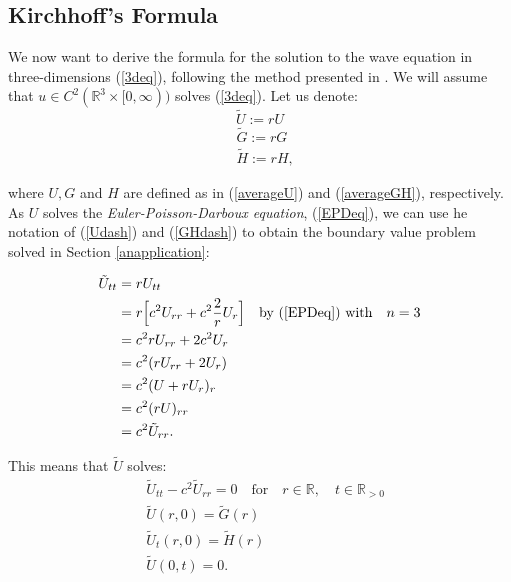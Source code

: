 \documentclass[a4paper, 12pt]{article}
\numberwithin{equation}{section}
\begin{document}
\subsection{Kirchhoff's Formula}
We now want to derive the formula for the solution to the wave equation in
three-dimensions (\ref{3deq}), following the method presented in \cite[Ch. 2.4.1.c]{Ev}. We will assume that $u \in C^2(\mathbb{R}^3
\times [0, \infty))$ solves (\ref{3deq}). Let us denote:
\begin{equation} \label{Udash}
    \tilde{U}:=rU
\end{equation}
\begin{equation} \label{GHdash}
    \begin{aligned}
        &\tilde{G}:=rG\\
        &\tilde{H}:=rH,    
    \end{aligned}
\end{equation}

where $U,G$ and $H$ are defined as in (\ref{averageU}) and (\ref{averageGH}),
respectively. \\

As $U$ solves the \emph{Euler-Poisson-Darboux equation}, (\ref{EPDeq}), we can
use he notation of (\ref{Udash}) and (\ref{GHdash}) to obtain the boundary value
problem solved in Section \ref{anapplication}:

\begin{equation*}
    \begin{aligned}
        \tilde{U}_{tt}&=rU_{tt}\\
        &=r\Big[c^2U_{rr}+c^2\frac{2}{r}U_r\Big] \quad \textrm{by (\ref{EPDeq}) with} \quad n=3\\
        &=c^2rU_{rr}+2c^2U_r\\
        &=c^2(rU_{rr}+2U_r)\\
        &=c^2(U+rU_r)_r\\
        &=c^2(rU)_{rr}\\
        &=c^2\tilde{U}_{rr}.        
    \end{aligned}
\end{equation*}

This means that $\tilde{U}$ solves:
\begin{equation} \label{tilUwave}
    \begin{aligned}
        &\tilde{U}_{tt}-c^2\tilde{U}_{rr}=0 \quad \textrm {for} \quad r \in \mathbb{R}, \quad t \in \mathbb{R}_{>0}\\
        &\tilde{U}(r, 0)=\tilde{G}(r) \\
        &\tilde{U}_t(r, 0)=\tilde{H}(r)\\
        &\tilde{U}(0, t)=0.
    \end{aligned}
\end{equation}
\end{document}
